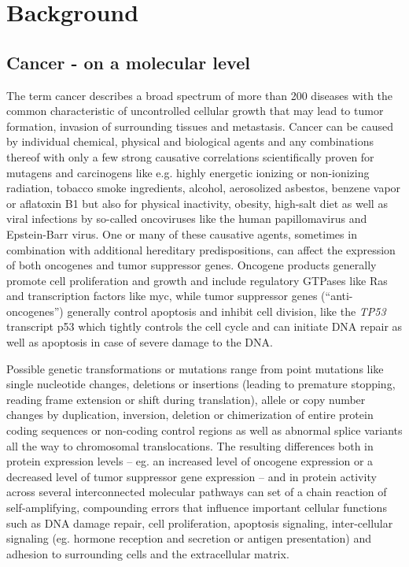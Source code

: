 \section{Background}


  \subsection[Cancer]{Cancer - on a molecular level}
  \label{sec:cancer}
  
  
  The term cancer describes a broad spectrum of more than 200 diseases with the
common characteristic of uncontrolled cellular growth that may lead to tumor
formation, invasion of surrounding tissues and metastasis. Cancer can be caused
by individual chemical, physical and biological agents and any combinations
thereof with only a few strong causative correlations scientifically proven for
mutagens and carcinogens like e.g. highly energetic ionizing or non-ionizing
radiation, tobacco smoke ingredients, alcohol, aerosolized asbestos, benzene
vapor or aflatoxin B1 but also for physical inactivity, obesity, high-salt diet
as well as viral infections by so-called oncoviruses like the human
papillomavirus and Epstein-Barr virus. One or many of these causative agents,
sometimes in combination with additional hereditary predispositions, can affect
the expression of both oncogenes and tumor suppressor genes. Oncogene products
generally promote cell proliferation and growth and include regulatory GTPases
like Ras and transcription factors like myc, while tumor suppressor genes
(``anti-oncogenes'') generally control apoptosis and inhibit cell division, like
the \textit{TP53} transcript p53 which tightly controls the cell cycle and can
initiate DNA repair as well as apoptosis in case of severe damage to the DNA. 
  
  Possible genetic transformations or mutations range from point mutations like
single nucleotide changes, deletions or insertions (leading to premature
stopping, reading frame extension or shift during translation), allele or copy
number changes by duplication, inversion, deletion or chimerization of entire
protein coding sequences or non-coding control regions as  well as abnormal
splice variants all the way to chromosomal translocations. The resulting
differences both in protein expression levels -- eg. an increased level of
oncogene expression or a decreased level of tumor suppressor gene expression --
and in protein activity across several interconnected molecular pathways can
set of a chain reaction of self-amplifying, compounding errors that influence
important cellular functions such as DNA damage repair, cell proliferation,
apoptosis signaling, inter-cellular signaling (eg. hormone reception and
secretion or antigen presentation) and adhesion to surrounding cells and the
extracellular matrix.
  
